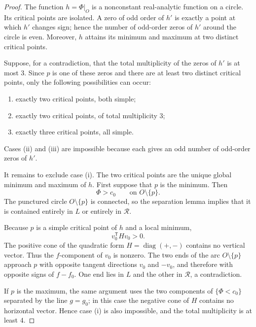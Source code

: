 \documentclass[10pt,a4paper]{amsart}
\newcommand{\restr}[2]{#1\big|_{#2}}
\begin{document}
\begin{proof}
The function $h=\restr{\Phi}{O}$ is a nonconstant real-analytic function
on a circle.  Its critical points are isolated.  A zero of odd order of
$h'$ is exactly a point at which $h'$ changes sign; hence the number of
odd-order zeros of $h'$ around the circle is even.  Moreover, $h$ attains
its minimum and maximum at two distinct critical points.

Suppose, for a contradiction, that the total multiplicity of the zeros
of $h'$ is at most $3$.  Since $p$ is one of these zeros and there are at
least two distinct critical points, only the following possibilities can
occur:
\begin{enumerate}[label=\textup{(\roman*)},leftmargin=2.4em]
  \item exactly two critical points, both simple;
  \item exactly two critical points, of total multiplicity $3$;
  \item exactly three critical points, all simple.
\end{enumerate}
Cases \textup{(ii)} and \textup{(iii)} are impossible because each gives
an odd number of odd-order zeros of $h'$.

It remains to exclude case \textup{(i)}.  The two critical points are the
unique global minimum and maximum of $h$.  First suppose that $p$ is the
minimum.  Then
\begin{equation}\label{eq:Phi-above}
  \Phi>c_0\qquad\text{on }O\setminus\{p\}.
\end{equation}
The punctured circle $O\setminus\{p\}$ is connected, so the separation
lemma implies that it is contained entirely in $L$ or entirely in
$\mathcal R$.

Because $p$ is a simple critical point of $h$ and a local minimum,
\begin{equation}\label{eq:positive-tangent}
  v_0^{\mathsf T}Hv_0>0.
\end{equation}
The positive cone of the quadratic form
$H=\operatorname{diag}(+,-)$ contains no vertical vector.  Thus the
$f$-component of $v_0$ is nonzero.  The two ends of the arc
$O\setminus\{p\}$ approach $p$ with opposite tangent directions $v_0$
and $-v_0$, and therefore with opposite signs of $f-f_0$.  One end lies
in $L$ and the other in $\mathcal R$, a contradiction.

If $p$ is the maximum, the same argument uses the two components of
$\{\Phi<c_0\}$ separated by the line $g=g_0$; in this case the negative
cone of $H$ contains no horizontal vector.  Hence case
\textup{(i)} is also impossible, and the total multiplicity is at least
$4$.
\end{proof}
\end{document}
